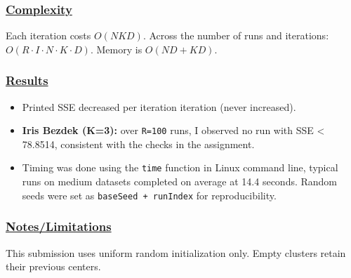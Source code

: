 \documentclass[12pt]{article}
\begin{document}
\subsubsection*{\underline{Complexity}}
\label{sec:orgbdbcd96}
Each iteration costs \(O(NKD)\). Across the number of runs and iterations: \(O(R \cdot I \cdot N \cdot K \cdot D)\). Memory is \(O(ND + KD)\).
\subsubsection*{\underline{Results}}
\label{sec:org3d76a57}
\begin{itemize}
\item Printed SSE decreased per iteration iteration (never increased).
\item \textbf{Iris Bezdek (K=3):} over \texttt{R=100} runs, I observed no run with SSE < 78.8514, consistent with the checks in the assignment.
\item Timing was done using the \texttt{time} function in Linux command line, typical runs on medium datasets completed on average at 14.4 seconds. Random seeds were set as \texttt{baseSeed + runIndex} for reproducibility.
\end{itemize}
\subsubsection*{\underline{Notes/Limitations}}
\label{sec:org94703f4}
This submission uses uniform random initialization only. Empty clusters retain their previous centers.
\end{document}
